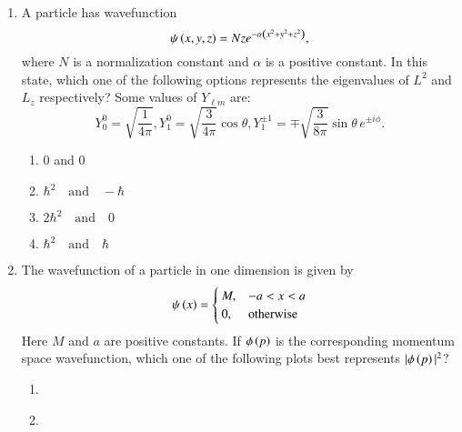 \documentclass[journal]{IEEEtran}
\begin{document}
\begin{enumerate}
\begin{enumerate}
\begin{figure}[H]
	\centering
	
\end{figure} 
\item 
\begin{figure}[H]
	\centering
	
\end{figure}
\item \begin{figure}[H]
	\centering
	
\end{figure}  
\item \begin{figure}[H]
	\centering
	
\end{figure} 
\end{enumerate}
\item A particle has wavefunction 
\[
	\psi\left(x, y, z\right) = N z e^{-\alpha\left(x^2 + y^2 + z^2\right)},
\]
where $N$ is a normalization constant and $\alpha$ is a positive constant. In this state, which one of the following options represents the eigenvalues of $L^2$ and $L_z$ respectively? Some values of $Y_{\ell m}$ are:
\[
Y_{0}^{0} = \sqrt{\frac{1}{4\pi}}, Y_{1}^{0} = \sqrt{\frac{3}{4\pi}} \cos \theta,  Y_{1}^{\pm 1} = \mp \sqrt{\frac{3}{8\pi}} \sin \theta \, e^{\pm i\phi}.
\]
\begin{enumerate}
\item 0 and 0
\item $\hbar^2 \quad \text{and} \quad -\hbar$
\item $2\hbar^2 \quad \text{and} \quad 0$
\item $\hbar^2 \quad \text{and} \quad \hbar$
\end{enumerate}
\item The wavefunction of a particle in one dimension is given by
\[
	\psi\left(x\right) = 
\begin{cases} 
M, & -a < x < a \\
0, & \text{otherwise} 
\end{cases}
\]
Here $M$ and $a$ are positive constants. If $\phi\left(p\right)$ is the corresponding momentum space wavefunction, which one of the following plots best represents $|\phi\left(p\right)|^2$?
\begin{enumerate}
\item \begin{figure}[H]
	\centering
	
\end{figure} 
\item \begin{figure}[H]
	\centering
	
\end{figure} 

\end{enumerate}
\end{enumerate}
\end{document}
